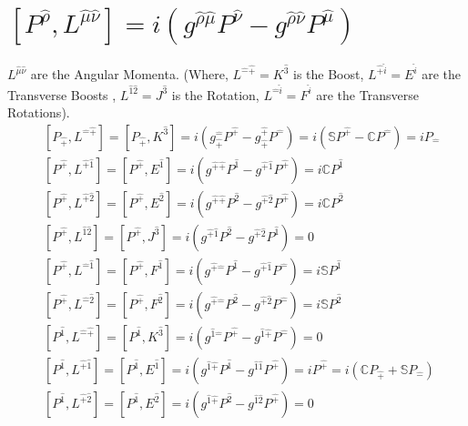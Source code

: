 \documentclass[]{article}
\numberwithin{equation}{section}
\begin{document}
\section{$\left[P^{\hat{\rho}},L^{\hat{\mu}\hat{\nu}}\right]=i\left(g^{\hat{\rho}\hat{\mu}}P^{\hat{\nu}}-g^{\hat{\rho}\hat{\nu}}P^{\hat{\mu}}\right)$}
$L^{\hat{\mu}\hat{\nu}}$ are the Angular Momenta. (Where, $L^{\hat{-}\hat{+}}=K^\hat{3}$ is  the Boost, $L^{\hat{+}\hat{i}}=E^\hat{i}$ are the  Transverse Boosts , $L^{\hat{1}\hat{2}}=J^\hat{3}$ is the Rotation, $L^{\hat{-}\hat{i}}=F^\hat{i}$ are the  Transverse Rotations). 
\begin{align}
    &\left[P_{\hat{+}},L^{\hat{-}\hat{+}}\right]=\left[P_{\hat{+}},K^{\hat{3}}\right]=i\left(g_{\hat{+}}^{\hat{-}}P^{\hat{+}}-g_{\hat{+}}^{\hat{+}}P^{\hat{-}}\right)=i\left(\mathbb{S}P^{\hat{+}}-\mathbb{C}P^{\hat{-}}\right)=iP_{\hat{-}}\\
    &\left[P^{\hat{+}},L^{\hat{+}\hat{1}}\right]=\left[P^{\hat{+}},E^\hat{1}\right]=i\left(g^{\hat{+}\hat{+}}P^{\hat{1}}-g^{\hat{+}\hat{1}}P^{\hat{+}}\right)=i\mathbb{C}P^{\hat{1}}\\
    &\left[P^{\hat{+}},L^{\hat{+}\hat{2}}\right]=\left[P^{\hat{+}},E^\hat{2}\right]=i\left(g^{\hat{+}\hat{+}}P^{\hat{2}}-g^{\hat{+}\hat{2}}P^{\hat{+}}\right)=i\mathbb{C}P^{\hat{2}}\\
    &\left[P^{\hat{+}},L^{\hat{1}\hat{2}}\right]=\left[P^{\hat{+}},J^\hat{3}\right]=i\left(g^{\hat{+}\hat{1}}P^{\hat{2}}-g^{\hat{+}\hat{2}}P^{\hat{1}}\right)=0\\
    &\left[P^{\hat{+}},L^{\hat{-}\hat{1}}\right]=\left[P^{\hat{+}},F^\hat{1}\right]=i\left(g^{\hat{+}\hat{-}}P^{\hat{1}}-g^{\hat{+}\hat{1}}P^{\hat{-}}\right)=i\mathbb{S}P^{\hat{1}}\\
    &\left[P^{\hat{+}},L^{\hat{-}\hat{2}}\right]=\left[P^{\hat{+}},F^\hat{2}\right]=i\left(g^{\hat{+}\hat{-}}P^{\hat{2}}-g^{\hat{+}\hat{2}}P^{\hat{-}}\right)=i\mathbb{S}P^{\hat{2}}\\
    &\left[P^{\hat{1}},L^{\hat{-}\hat{+}}\right]=\left[P^{\hat{1}},K^\hat{3}\right]=i\left(g^{\hat{1}\hat{-}}P^{\hat{+}}-g^{\hat{1}\hat{+}}P^{\hat{-}}\right)=0\\
    &\left[P^{\hat{1}},L^{\hat{+}\hat{1}}\right]=\left[P^{\hat{1}},E^\hat{1}\right]=i\left(g^{\hat{1}\hat{+}}P^{\hat{1}}-g^{\hat{1}\hat{1}}P^{\hat{+}}\right)=iP^{\hat{+}}=i\left(\mathbb{C}P_{\hat{+}}+\mathbb{S}P_{\hat{-}}\right)\\
    &\left[P^{\hat{1}},L^{\hat{+}\hat{2}}\right]=\left[P^{\hat{1}},E^\hat{2}\right]=i\left(g^{\hat{1}\hat{+}}P^{\hat{2}}-g^{\hat{1}\hat{2}}P^{\hat{+}}\right)=0\\

\end{align}
\end{document}
